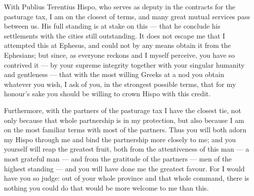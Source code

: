 

 With Publius Terentius Hispo, who serves as deputy in the contracts for the pasturage tax, I am on the closest of terms, and many great mutual services pass between us. His full standing is at stake on this --- that he conclude his settlements with the cities still outstanding. It does not escape me that I attempted this at Ephesus, and could not by any means obtain it from the Ephesians; but since, as everyone reckons and I myself perceive, you have so contrived it --- by your supreme integrity together with your singular humanity and gentleness --- that with the most willing Greeks at a nod you obtain whatever you wish, I ask of you, in the strongest possible terms, that for my honour's sake you should be willing to crown Hispo with this credit.

 Furthermore, with the partners of the pasturage tax I have the closest tie, not only because that whole partnership is in my protection, but also because I am on the most familiar terms with most of the partners. Thus you will both adorn my Hispo through me and bind the partnership more closely to me; and you yourself will reap the greatest fruit, both from the attentiveness of this man --- a most grateful man --- and from the gratitude of the partners --- men of the highest standing --- and you will have done me the greatest favour. For I would have you so judge: out of your whole province and that whole command, there is nothing you could do that would be more welcome to me than this.
